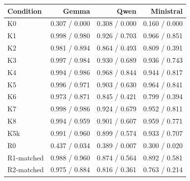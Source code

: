 \begin{tabular}{lrrr}
\toprule
Condition & Gemma & Qwen & Ministral \\
\midrule
K0 & 0.307 / 0.000 & 0.308 / 0.000 & 0.160 / 0.000 \\
K1 & 0.998 / 0.980 & 0.926 / 0.703 & 0.966 / 0.851 \\
K2 & 0.981 / 0.894 & 0.864 / 0.493 & 0.809 / 0.391 \\
K3 & 0.997 / 0.984 & 0.930 / 0.689 & 0.936 / 0.743 \\
K4 & 0.994 / 0.986 & 0.968 / 0.844 & 0.944 / 0.817 \\
K5 & 0.996 / 0.971 & 0.903 / 0.630 & 0.964 / 0.841 \\
K6 & 0.973 / 0.871 & 0.845 / 0.421 & 0.799 / 0.394 \\
K7 & 0.998 / 0.986 & 0.924 / 0.679 & 0.952 / 0.811 \\
K8 & 0.994 / 0.959 & 0.901 / 0.607 & 0.959 / 0.771 \\
K5k & 0.991 / 0.960 & 0.899 / 0.574 & 0.933 / 0.707 \\
R0 & 0.437 / 0.034 & 0.389 / 0.007 & 0.300 / 0.020 \\
R1-matched & 0.988 / 0.960 & 0.874 / 0.564 & 0.892 / 0.581 \\
R2-matched & 0.975 / 0.884 & 0.816 / 0.361 & 0.763 / 0.214 \\
\bottomrule
\end{tabular}
